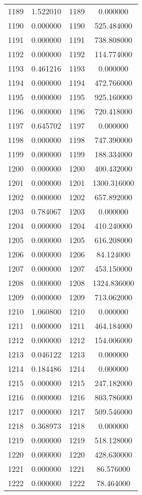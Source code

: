 \documentclass[12pt]{article}
\begin{document}
\begin{longtable}{@{}cccc@{}}
1189 & 1.522010 & 1189 & 0.000000 \\
1190 & 0.000000 & 1190 & 525.484000 \\
1191 & 0.000000 & 1191 & 738.808000 \\
1192 & 0.000000 & 1192 & 114.774000 \\
1193 & 0.461216 & 1193 & 0.000000 \\
1194 & 0.000000 & 1194 & 472.766000 \\
1195 & 0.000000 & 1195 & 925.160000 \\
1196 & 0.000000 & 1196 & 720.418000 \\
1197 & 0.645702 & 1197 & 0.000000 \\
1198 & 0.000000 & 1198 & 747.390000 \\
1199 & 0.000000 & 1199 & 188.334000 \\
1200 & 0.000000 & 1200 & 400.432000 \\
1201 & 0.000000 & 1201 & 1300.316000 \\
1202 & 0.000000 & 1202 & 657.892000 \\
1203 & 0.784067 & 1203 & 0.000000 \\
1204 & 0.000000 & 1204 & 410.240000 \\
1205 & 0.000000 & 1205 & 616.208000 \\
1206 & 0.000000 & 1206 & 84.124000 \\
1207 & 0.000000 & 1207 & 453.150000 \\
1208 & 0.000000 & 1208 & 1324.836000 \\
1209 & 0.000000 & 1209 & 713.062000 \\
1210 & 1.060800 & 1210 & 0.000000 \\
1211 & 0.000000 & 1211 & 464.184000 \\
1212 & 0.000000 & 1212 & 154.006000 \\
1213 & 0.046122 & 1213 & 0.000000 \\
1214 & 0.184486 & 1214 & 0.000000 \\
1215 & 0.000000 & 1215 & 247.182000 \\
1216 & 0.000000 & 1216 & 803.786000 \\
1217 & 0.000000 & 1217 & 509.546000 \\
1218 & 0.368973 & 1218 & 0.000000 \\
1219 & 0.000000 & 1219 & 518.128000 \\
1220 & 0.000000 & 1220 & 428.630000 \\
1221 & 0.000000 & 1221 & 86.576000 \\
1222 & 0.000000 & 1222 & 78.464000 \\

\end{longtable}
\end{document}
